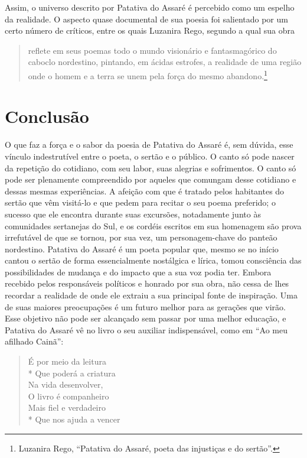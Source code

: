 Assim, o universo descrito por Patativa do Assaré é percebido como um espelho da
realidade. O aspecto quase documental de sua poesia foi salientado por um certo
número de críticos, entre os quais Luzanira Rego, segundo a qual sua obra

\begin{quote}
reflete em seus poemas todo o mundo visionário e fantasmagórico do caboclo
nordestino, pintando, em ácidas estrofes, a realidade de uma região onde o homem
e a terra se unem pela força do mesmo abandono.\footnote{ Luzanira Rego,
“Patativa do Assaré, poeta das injustiças e do sertão”.}
\end{quote}


\section{Conclusão}

O que faz a força e o sabor da poesia de Patativa do Assaré é, sem dúvida, esse
vínculo indestrutível entre o poeta, o sertão e o público. O canto só pode
nascer da repetição do cotidiano, com seu labor, suas alegrias e sofrimentos. O
canto só pode ser plenamente compreendido por aqueles que comungam desse
cotidiano e dessas mesmas experiências. A afeição com que é tratado pelos
habitantes do sertão que vêm visitá-lo e que pedem para recitar o seu poema
preferido; o sucesso que ele encontra durante suas excursões, notadamente junto
às comunidades sertanejas do Sul, e os cordéis escritos em sua homenagem são
prova irrefutável de que se tornou, por sua vez, um personagem-chave do panteão
nordestino. Patativa do Assaré é um poeta popular que, mesmo se no início
cantou o sertão de forma essencialmente nostálgica e lírica, tomou consciência
das possibilidades de mudança e do impacto que a sua voz podia ter. Embora
recebido pelos responsáveis políticos e honrado por sua obra, não cessa de lhes
recordar a realidade de onde ele extraiu a sua principal fonte de inspiração.
Uma de suas maiores preocupações é um futuro melhor para as gerações que virão.
Esse objetivo não pode ser alcançado sem passar por uma melhor educação, e
Patativa do Assaré vê no livro o seu auxiliar indispensável, como em “Ao meu
afilhado Cainã”: 

\begin{verse}
É por meio da leitura \\*
Que poderá a criatura \\
Na vida desenvolver, \\
O livro é companheiro \\
Mais fiel e verdadeiro \\*
Que nos ajuda a vencer 
\end{verse}

